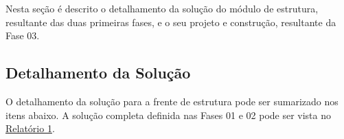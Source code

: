 \label{desenvolvimento_estrutura}
Nesta seção é descrito o detalhamento da solução do módulo de estrutura, resultante das duas primeiras fases, 
e o seu projeto e construção, resultante da Fase 03.

\subsection{Detalhamento da Solução}

O detalhamento da solução para a frente de estrutura pode ser sumarizado nos itens abaixo. A solução completa definida nas 
  Fases 01 e 02 pode ser vista no \href{https://drive.google.com/file/d/0B5InkGKx6O-MR1B3eVYzZFpjQ3c/view?usp=sharing}{Relatório 1}.






